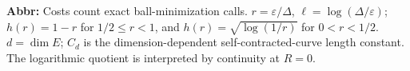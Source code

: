 \begin{table}[tp]
\begin{threeparttable}
\begin{tablenotes}[flushleft]
\item[] \textbf{Abbr:} Costs count exact ball-minimization calls. $r=\varepsilon/\Delta$, $\ell=\log(\Delta/\varepsilon)$; $h(r)=1-r$ for $1/2\le r<1$, and $h(r)=\sqrt{\log(1/r)}$ for $0<r<1/2$. $d=\dim E$; $C_d$ is the dimension-dependent self-contracted-curve length constant. The logarithmic quotient is interpreted by continuity at $R=0$.
\end{tablenotes}
\end{threeparttable}
\end{table}
\clearpage
